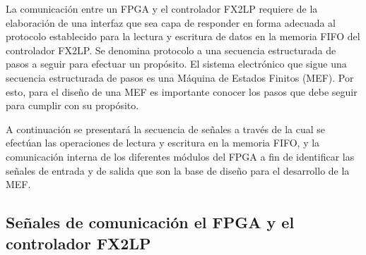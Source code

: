 La comunicación entre un FPGA y el controlador FX2LP requiere de la elaboración de una interfaz que sea capa de responder en forma adecuada al protocolo establecido para la lectura y escritura de datos en la memoria FIFO del controlador FX2LP. Se denomina protocolo a una secuencia estructurada de pasos a seguir para efectuar un propósito. El sistema electrónico que sigue una secuencia estructurada de pasos es una Máquina de Estados Finitos (MEF). Por esto, para el diseño de una MEF es importante conocer los pasos que debe seguir para cumplir con su propósito.

A continuación se presentará la secuencia de señales a través de la cual se efectúan las operaciones de lectura y escritura en la memoria FIFO, y la comunicación interna de los diferentes módulos del FPGA a fin de identificar las señales de entrada y de salida que son la base de diseño para el desarrollo de la MEF.




\subsection{Señales de comunicación el FPGA y el controlador FX2LP}

